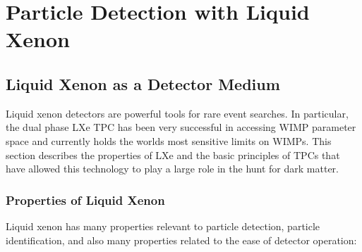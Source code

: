 \chapter{Particle Detection with Liquid Xenon}

\label{ch:LXeTPCs} 

\section{Liquid Xenon as a Detector Medium}
Liquid xenon detectors are powerful tools for rare event searches. In particular, the dual phase \ac{LXe} \ac{TPC} has been very successful in accessing \ac{WIMP} parameter space and currently holds the worlds most sensitive limits on \ac{WIMP}s. This section describes the properties of \ac{LXe} and the basic principles of \ac{TPC}s that have allowed this technology to play a large role in the hunt for dark matter.

\subsection{Properties of Liquid Xenon}
Liquid xenon has many properties relevant to particle detection, particle identification, and also many properties related to the ease of detector operation:

